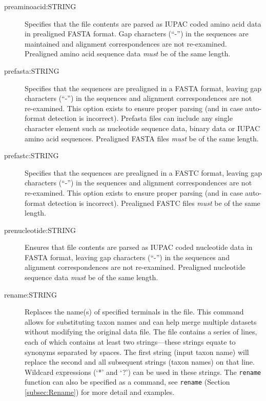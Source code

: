 \begin{description}
		\item [preaminoacid:STRING] Specifies that the file contents are parsed as IUPAC coded 
		amino acid data in prealigned FASTA \citep{PearsonandLipman1988} format. Gap characters 
		(``-'') in the sequences are maintained and alignment correspondences are not re-examined.
		Prealigned amino acid sequence data \textit{must} be of the same length.
	
		\item [prefasta:STRING] Specifies that the sequences are prealigned in a FASTA format, 
		leaving gap characters (``-'') in the sequences and alignment correspondences are not 
		re-examined. This option exists to ensure proper parsing (and in case auto-format detection 
		is incorrect). Prefasta files can include any single character element such as nucleotide 
		sequence data, binary data or IUPAC amino acid sequences. Prealigned FASTA files 
		\textit{must} be of the same length. 
			
		\item [prefastc:STRING] Specifies that the sequences are prealigned in a FASTC format, 
		leaving gap characters (``-'') in the sequences and alignment correspondences are not 
		re-examined. This option exists to ensure proper parsing (and in case auto-format detection 
		is incorrect). Prealigned FASTC files \textit{must} be of the same length.
		
		
		\item [prenucleotide:STRING] Ensures that file contents are parsed as IUPAC coded 
		nucleotide data in FASTA \citep{PearsonandLipman1988} format, leaving gap characters 
		(``-'') in the sequences and alignment correspondences are not re-examined. Prealigned 
		nucleotide sequence data \textit{must} be of the same length.
		
		\item [rename:STRING] Replaces the name(s) of specified terminals in the file. This 
		command allows for substituting taxon names and can help merge multiple datasets without 
		modifying the original data file. The file contains a series of lines, each of which contains at 
		least two strings---these strings equate to synonyms separated by spaces. The first string 
		(input taxon name) will replace the second and all subsequent strings (taxon names) on 
		that line. Wildcard expressions (‘*’ and ‘?’) can be used in these strings. The \texttt{rename} 
		function can also be specified as a command, see \texttt{rename}
		(Section \ref{subsec:Rename}) for more detail and examples.\\
					 

\end{description}
